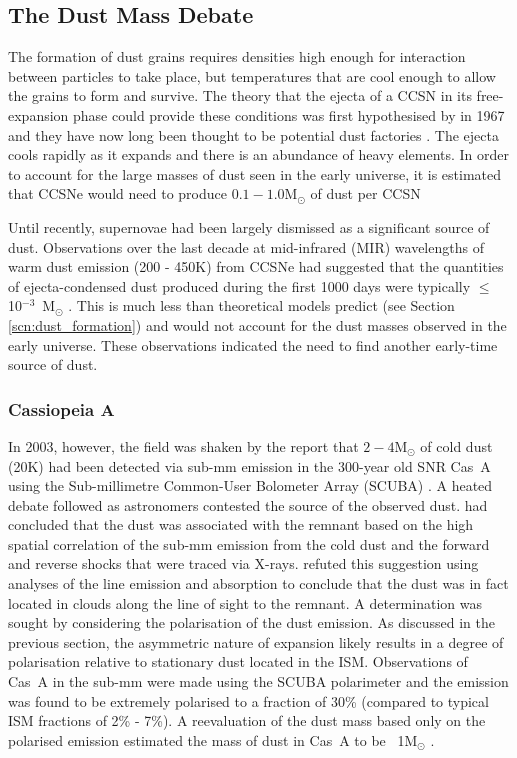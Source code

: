 \subsection{The Dust Mass Debate}

The formation of dust grains requires densities high enough for interaction between particles to take place, but temperatures that are cool enough to allow the grains to form and survive.  The theory that the ejecta of a CCSN in its free-expansion phase could provide these conditions  was first hypothesised by \citeauthor{Cernuschi1967} in 1967 and they have now long been thought to be potential dust factories \citep{Hoyle1970, Kozasa1991, Todini2001,Nozawa2003}.  The ejecta cools rapidly as it expands and there is an abundance of heavy elements.  In order to account for the large masses of dust seen in the early universe, it is estimated that CCSNe would need to produce  $0.1-1.0$M$_\odot$ of dust per CCSN  \citep{Morgan2003, Dwek2007}

Until recently, supernovae had been largely dismissed as a significant source of dust.  Observations over the last decade at mid-infrared (MIR) wavelengths of warm dust emission (200 - 450K)  from CCSNe had suggested that the quantities of ejecta-condensed dust produced during the first 1000 days were typically $\leq$ 10$^{-3}$~M$_\odot$  \citep{Sugerman2006, Meikle2007, Kotak2009, Andrews2010, Fabbri2011}.  This is much less than theoretical models predict (see Section \ref{scn:dust_formation}) and would not account for the dust masses observed in the early universe.  These observations indicated the need to find another early-time source of dust.

\subsubsection{Cassiopeia A}

In 2003, however, the field was shaken by the report that $2-4$M$_{\odot}$ of cold dust (20K) had been detected via sub-mm emission in the 300-year old SNR Cas~A using the Sub-millimetre Common-User Bolometer Array (SCUBA) \citep{Dunne2003}.   A heated debate followed as astronomers contested the source of the observed dust.  \citet{Dunne2003} had concluded that the dust was associated with the remnant based on the high spatial correlation of the sub-mm emission from the cold dust and the forward and reverse shocks that were traced via X-rays. \citet{Krause2004} refuted this suggestion using analyses of the line emission and absorption to conclude that the dust was in fact located in clouds along the line of sight to the remnant.  A determination was sought by considering the polarisation of the dust emission.  As discussed in the previous section, the asymmetric nature of expansion likely results in a degree of polarisation relative to stationary dust located in the ISM.  Observations of Cas~A in the sub-mm were made using the SCUBA polarimeter and the emission was found to be extremely polarised to a fraction of 30\% (compared to typical ISM fractions of 2\% - 7\%).  A reevaluation of the dust mass based only on the polarised emission  estimated the mass of dust in Cas~A to be ~1M$_{\odot}$ \citep{Dunne2009}.

